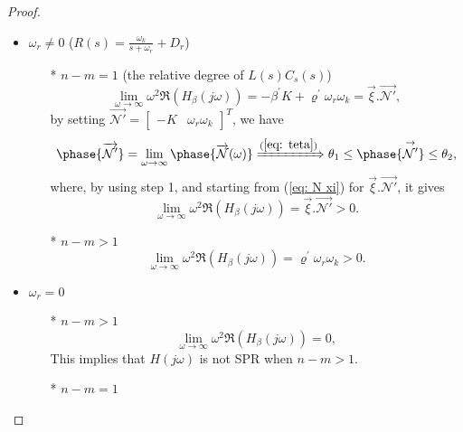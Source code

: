 \begin{proof}
\begin{itemize}
    \item $\omega_r\neq0$ ($R(s)=\frac{\omega_k}{s+\omega_r}+D_r$) \\
    \begin{itemize}
        \item[*] $n - m = 1$ (the relative degree of ${L}(s)C_s(s)$)\\
        \begin{equation}
    \lim_{\omega \to \infty} \omega^2\mathfrak{R}(H_\beta(j\omega))=-\beta^{'}K+\varrho^{'}\omega_r \omega_k=\overrightarrow{\xi} . \overrightarrow{\mathcal{N'}},
\end{equation}
by setting $\overrightarrow{\mathcal{N'}}=\begin{bmatrix}
     -K & \omega_r \omega_k
    \end{bmatrix}^{T}$, we have
    \begin{equation}
        \phase{\overrightarrow{\mathcal{N'}}}=\lim_{\omega \to \infty}\phase{\overrightarrow{\mathcal{N}}(\omega)}\xRightarrow{(\ref{eq: teta})}\theta_1 \leq \phase{\stackrel{\rightarrow}{\mathcal{N'}}} \leq \theta_2,
    \label{eq: N_theta}
    \end{equation}
where, by using step 1, and starting from (\ref{eq: N xi}) for $\overrightarrow{\xi} .  \overrightarrow{\mathcal{N'}}$, it gives
\begin{equation}
    \lim_{\omega \to \infty} \omega^2\mathfrak{R}(H_\beta(j\omega))=\overrightarrow{\xi} . \overrightarrow{\mathcal{N'}}>0.
\end{equation}
\item[*] $n-m> 1$ \\
\begin{equation}
    \lim_{\omega \to \infty} \omega^2\mathfrak{R}(H_\beta(j\omega))=\varrho^{'}\omega_r \omega_k>0.
    \end{equation}
    \end{itemize}
\item $\omega_r=0$ \\
    \begin{itemize}
        \item[*] $n-m>1$ \\
        \begin{equation}
            \lim_{\omega \to \infty} \omega^2\mathfrak{R}(H_\beta(j\omega))=0,
        \end{equation}
        This implies that $H(j\omega)$ is not SPR when $n - m > 1$.
        \item[*] $n - m = 1$ \\

\end{itemize}
\end{itemize}
\end{proof}
